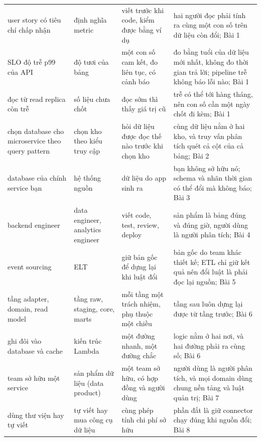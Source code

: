 \begin{xltabular}{\textwidth}{@{}P{3.2cm} P{2.8cm} L L@{}}
\toprule
{} &  &  &  \\
\midrule
\endhead
\bottomrule
\endfoot
user story có tiêu chí chấp nhận & định nghĩa metric & viết trước khi code, kiểm được bằng ví dụ & hai người đọc phải tính ra cùng một con số trên dữ liệu còn đổi; Bài 1 \\
SLO độ trễ p99 của API & độ tươi của bảng & một con số cam kết, đo liên tục, có cảnh báo & đo bằng tuổi của dữ liệu mới nhất, không đo thời gian trả lời; pipeline trễ không báo lỗi nào; Bài 1 \\
đọc từ read replica còn trễ & số liệu chưa chốt & đọc sớm thì thấy giá trị cũ & trễ có thể tới hàng tháng, nên con số cần một ngày chốt đi kèm; Bài 1 \\
chọn database cho microservice theo query pattern & chọn kho theo kiểu truy cập & hỏi dữ liệu được đọc thế nào trước khi chọn kho & cùng dữ liệu nằm ở hai kho, và truy vấn phân tích quét cả cột của cả bảng; Bài 2 \\
database của chính service bạn & hệ thống nguồn & dữ liệu do app sinh ra & bạn không sở hữu nó; schema và nhãn thời gian có thể đổi mà không báo; Bài 3 \\
backend engineer & data engineer, analytics engineer & viết code, test, review, deploy & sản phẩm là bảng đúng và đúng giờ, người dùng là người phân tích; Bài 4 \\
event sourcing & ELT & giữ bản gốc để dựng lại khi luật đổi & bản gốc do team khác thiết kế; ETL chỉ giữ kết quả nên đổi luật là phải đọc lại nguồn; Bài 5 \\
tầng adapter, domain, read model & tầng raw, staging, core, marts & mỗi tầng một trách nhiệm, phụ thuộc một chiều & tầng sau luôn dựng lại được từ tầng trước; Bài 6 \\
ghi đôi vào database và cache & kiến trúc Lambda & một đường nhanh, một đường chắc & logic nằm ở hai nơi, và hai đường phải ra cùng số; Bài 6 \\
team sở hữu một service & sản phẩm dữ liệu (data product) & một team sở hữu, có hợp đồng và người dùng & người dùng là người phân tích, và mọi domain dùng chung nền tảng và luật quản trị; Bài 7 \\
dùng thư viện hay tự viết & tự viết hay mua công cụ dữ liệu & cùng phép tính chi phí sở hữu & phần đắt là giữ connector chạy đúng khi nguồn đổi; Bài 8 \\
\end{xltabular}

